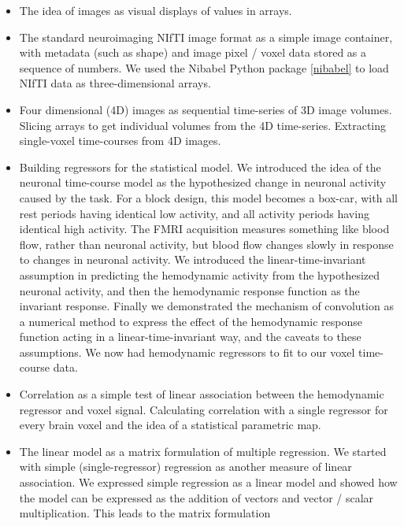 \begin{itemize}

\item
    The idea of images as visual displays of values in arrays.
\item
    The standard neuroimaging NIfTI image format as a simple image container,
        with metadata (such as shape) and image pixel / voxel data stored as
        a sequence of numbers.  We used the Nibabel Python package
        \cref{nibabel} to load NIfTI data as three-dimensional arrays.
\item
    Four dimensional (4D) images as sequential time-series of 3D image
        volumes.  Slicing arrays to get individual volumes from the 4D
        time-series.  Extracting single-voxel time-courses from 4D images.
\item
    Building regressors for the statistical model.  We introduced the idea of
        the neuronal time-course model as the hypothesized change in neuronal
        activity caused by the task.  For a block design, this model becomes a
        box-car, with all rest periods having identical low activity, and all
        activity periods having identical high activity.  The FMRI acquisition
        measures something like blood flow, rather than neuronal activity, but
        blood flow changes slowly in response to changes in neuronal activity.
        We introduced the linear-time-invariant assumption in predicting the
        hemodynamic activity from the hypothesized neuronal activity, and then
        the hemodynamic response function as the invariant response.  Finally
        we demonstrated the mechanism of convolution as a numerical method to
        express the effect of the hemodynamic response function acting in a
        linear-time-invariant way, and the caveats to these assumptions.  We
        now had hemodynamic regressors to fit to our voxel time-course data.
\item
    Correlation as a simple test of linear association between the hemodynamic
        regressor and voxel signal.  Calculating correlation with a single
        regressor for every brain voxel and the idea of a statistical
        parametric map.
\item
    The linear model as a matrix formulation of multiple regression.  We started with
        simple (single-regressor) regression as another measure of linear
        association.  We expressed simple regression as a linear model and
        showed how the model can be expressed as the addition of vectors and
        vector / scalar multiplication.  This leads to the matrix formulation

\end{itemize}
